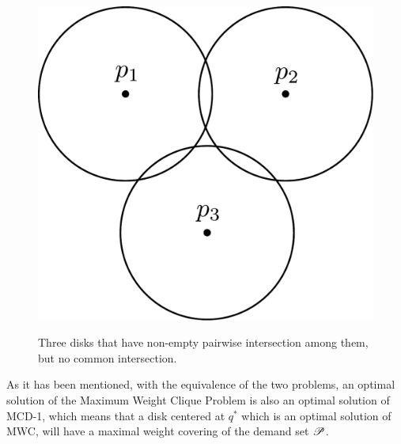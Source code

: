 \begin{figure}[H]
\centering

    \caption{Three disks that have non-empty pairwise intersection among them, but no common intersection.}

    
    
    
       
    \includegraphics[scale=.35]{tex/figures/three_disks_no_intersection.pdf}
    \label{fig:three_disks_no_intersection}
    \fautor
\end{figure}

As it has been mentioned, with the equivalence of the two problems, an optimal solution of the Maximum Weight Clique Problem is also an optimal solution of MCD-1, which means that a disk centered at $q^*$ which is an optimal solution of MWC, will have a maximal weight covering of the demand set $\mathscr{P}$.

